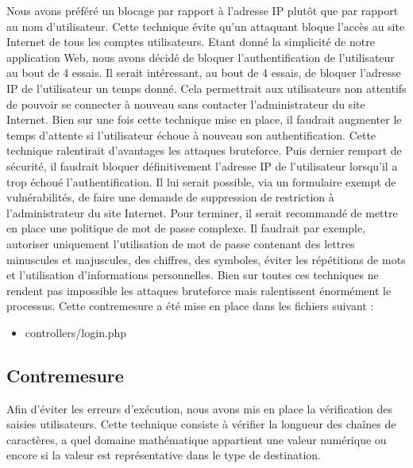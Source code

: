 \documentclass[12pt]{article}
\begin{document}
Nous avons préféré un blocage par rapport à l'adresse IP plutôt que par rapport au nom d'utilisateur. Cette technique évite qu'un attaquant bloque l'accès au site Internet de tous les comptes utilisateurs. Etant donné la simplicité de notre application Web, nous avons décidé de bloquer l'authentification de l'utilisateur au bout de 4 essais. Il serait intéressant, au bout de 4 essais, de bloquer l'adresse IP de l'utilisateur un temps donné. Cela permettrait aux utilisateurs non attentifs de pouvoir se connecter à nouveau sans contacter l'administrateur du site Internet. Bien sur une fois cette technique mise en place, il faudrait augmenter le temps d'attente si l'utilisateur échoue à nouveau son authentification. Cette technique ralentirait d'avantages les attaques bruteforce. Puis dernier rempart de sécurité, il faudrait bloquer définitivement l'adresse IP de l'utilisateur lorsqu'il a trop échoué l'authentification. Il lui serait possible, via un formulaire exempt de vulnérabilités, de faire une demande de suppression de restriction à l'administrateur du site Internet.
Pour terminer, il serait recommandé de mettre en place une politique de mot de passe complexe. Il faudrait par exemple,  autoriser uniquement l'utilisation de mot de passe contenant des lettres minuscules et majuscules, des chiffres, des symboles, éviter les répétitions de mots et l'utilisation d'informations personnelles. 
Bien sur toutes ces techniques ne rendent pas impossible les attaques bruteforce mais ralentissent énormément le processus.
Cette contremesure a été mise en place dans les fichiers suivant :

\begin{itemize}
\item controllers/login.php
\end{itemize}

\subsection{Contremesure}\label{c7}

Afin d'éviter les erreurs d'exécution, nous avons mis en place la vérification des saisies utilisateurs. Cette technique consiste à vérifier la longueur des chaînes de caractères, a quel domaine mathématique appartient une valeur numérique ou encore si la valeur est représentative dans le type de destination.
\end{document}
